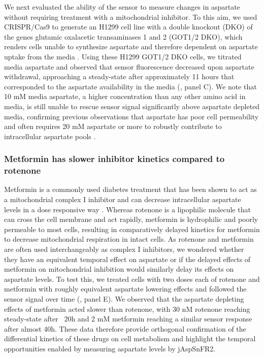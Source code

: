 \documentclass[9pt,lineno]{elife}
\begin{document}
We next evaluated the ability of the sensor to measure changes in aspartate without requiring treatment with a mitochondrial inhibitor.
To this aim, we used CRISPR/Cas9 to generate an H1299 cell line with a double knockout (DKO) of the genes glutamic oxalacetic transaminases 1 and 2 (GOT1/2 DKO), which renders cells unable to synthesize aspartate and therefore dependent on aspartate uptake from the media \citep{Garcia-Bermudez2022-qn}.
Using these H1299 GOT1/2 DKO cells, we titrated media aspartate and observed that sensor fluorescence decreased upon aspartate withdrawal, approaching a steady-state after approximately 11 hours that corresponded to the aspartate availability in the media (, panel C).
We note that 10 mM media aspartate, a higher concentration than any other amino acid in media, is still unable to rescue sensor signal significantly above aspartate depleted media, confirming previous observations that aspartate has poor cell permeability and often requires 20 mM aspartate or more to robustly contribute to intracellular aspartate pools \citep{Sullivan2018-gz}.


\subsubsection{Metformin has slower inhibitor kinetics compared to rotenone}
Metformin is a commonly used diabetes treatment that has been shown to act as a mitochondrial complex I inhibitor \citep{Owen2000-ri, El-Mir2000-qm, Andrzejewski2014-wm, Wheaton2014-ka} and can decrease intracellular aspartate levels in a dose responsive way \citep{Gui2016-ca}.
Whereas rotenone is a lipophilic molecule that can cross the cell membrane and act rapidly, metformin is hydrophilic and poorly permeable to most cells, resulting in comparatively delayed kinetics for metformin to decrease mitochondrial respiration in intact cells.
As rotenone and metformin are often used interchangeably as complex I inhibitors, we wondered whether they have an equivalent temporal effect on aspartate or if the delayed effects of metformin on mitochondrial inhibition would similarly delay its effects on aspartate levels.
To test this, we treated cells with two doses each of rotenone and metformin with roughly equivalent aspartate lowering effects and followed the sensor signal over time (, panel E).
We observed that the aspartate depleting effects of metformin acted slower than rotenone, with 30 nM rotenone reaching steady-state after ~20h and 2 mM metformin reaching a similar sensor response after almost 40h.
These data therefore provide orthogonal confirmation of the differential kinetics of these drugs on cell metabolism and highlight the temporal opportunities enabled by measuring aspartate levels by jAspSnFR2.
\end{document}
